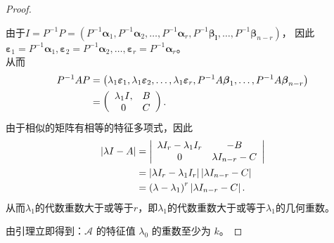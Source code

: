 \begin{enumerate}[1~]
\begin{proof}
\begin{subproof}
由于$I = P ^ { - 1 } P = \left( P ^ { - 1 } \boldsymbol { \alpha } _ { 1 } , P ^ { - 1 } \boldsymbol { \alpha } _ { 2 } , \dots , P ^ { - 1 } \boldsymbol { \alpha } _ { r } , P ^ { - 1 } \boldsymbol { \beta } _ { \mathbf { l } } , \dots , P ^ { - 1 } \boldsymbol { \beta } _ { n - r } \right)$，
因此$\boldsymbol{\varepsilon} _ { 1 } = P ^ { - 1 } \boldsymbol { \alpha } _ { 1 } , \boldsymbol { \varepsilon } _ { 2 } = P ^ { - 1 } \boldsymbol { \alpha } _ { 2 } , \dots , \boldsymbol { \varepsilon } _ { r } = P ^ { - 1 } \boldsymbol { \alpha } _ { r }$。\\
从而
\begin{align*}
P ^ { - 1 } A P &= \left( \lambda _ { 1 } \boldsymbol{\varepsilon} _ { 1 } , \lambda _ { 1 } \boldsymbol{\varepsilon} _ { 2 } , \dots , \lambda _ { 1 } \boldsymbol{\varepsilon} _ { r } , P ^ { - 1 } A \boldsymbol{\beta} _ { 1 } , \dots , P ^ { - 1 } A \boldsymbol { \beta } _ { n-r } \right)\\
&= \left( \begin{array} { c c } { \lambda _ { 1 } I , } & { B } \\ { 0 } & { C } \end{array} \right).
\end{align*}
由于相似的矩阵有相等的特征多项式，因此
\begin{align*}
| \lambda I - A | &= \left| \begin{array} { c c } { \lambda I _ { r } - \lambda _ { 1 } I _ { r } } & { - B } \\ { 0 } & { \lambda I _ { n - r } - C } \end{array} \right|\\
&= \left| \lambda I _ { r } - \lambda _ { 1 } I _ { r } \right| \left| \lambda I _ { n - r } - C \right|\\
&= \left( \lambda - \lambda _ { 1 } \right) ^ { r } \left| \lambda I _ { n - r } - C \right|.
\end{align*}
从而$\lambda_1$的代数重数大于或等于$r$，即$\lambda_1$的代数重数大于或等于$\lambda_1$的几何重数。
\end{subproof}
由引理立即得到：$\mathscr{A}$ 的特征值 $\lambda_0$ 的重数至少为 $k$。
\end{proof}
\end{enumerate}
\endinput